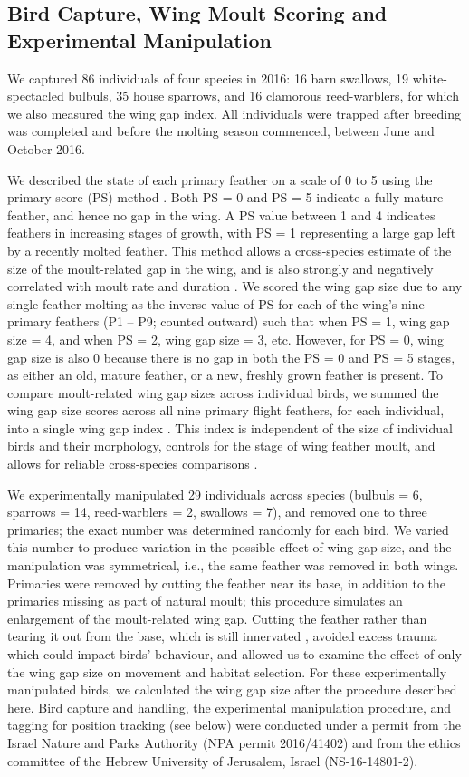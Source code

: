 \subsection*{Bird Capture, Wing Moult Scoring and Experimental Manipulation}

We captured 86 individuals of four species in 2016: 16 barn swallows, 19 white-spectacled bulbuls, 35 house sparrows, and 16 clamorous reed-warblers, for which we also measured the wing gap index.
All individuals were trapped after breeding was completed and before the molting season commenced, between June and October 2016.

We described the state of each primary feather on a scale of 0 to 5 using the primary score (PS) method \citep{ginn1983}.
Both PS = 0 and PS = 5 indicate a fully mature feather, and hence no gap in the wing.
A PS value between 1 and 4 indicates feathers in increasing stages of growth, with PS = 1 representing a large gap left by a recently molted feather.
This method allows a cross-species estimate of the size of the moult-related gap in the wing, and is also strongly and negatively correlated with moult rate and duration \citep{rohwer2009}.
We scored the wing gap size due to any single feather molting as the inverse value of PS for each of the wing's nine primary feathers (P1 -- P9; counted outward) such that when PS = 1, wing gap size = 4, and when PS = 2, wing gap size = 3, etc.
However, for PS = 0, wing gap size is also 0 because there is no gap in both the PS = 0 and PS = 5 stages, as either an old, mature feather, or a new, freshly grown feather is present.
To compare moult-related wing gap sizes across individual birds, we summed the wing gap size scores across all nine primary flight feathers, for each individual, into a single wing gap index \citep{kiat2016}.
This index is independent of the size of individual birds and their morphology, controls for the stage of wing feather moult, and allows for reliable cross-species comparisons \citep{bensch1993,kiat2016}.

We experimentally manipulated 29 individuals across species {(bulbuls = 6, sparrows = 14, reed-warblers = 2, swallows = 7)}, and removed one to three primaries; the exact number was determined randomly for each bird.
We varied this number to produce variation in the possible effect of wing gap size, and the manipulation was symmetrical, i.e., the same feather was removed in both wings.
Primaries were removed by cutting the feather near its base, in addition to the primaries missing as part of natural moult; this procedure simulates an enlargement of the moult-related wing gap.
Cutting the feather rather than tearing it out from the base, which is still innervated \parencite{jenni2020}, avoided excess trauma which could impact birds' behaviour, and allowed us to examine the effect of only the wing gap size on movement and habitat selection.
For these experimentally manipulated birds, we calculated the wing gap size after the procedure described here.
Bird capture and handling, the experimental manipulation procedure, and tagging for position tracking (see below) were conducted under a permit from the Israel Nature and Parks Authority (NPA permit 2016/41402) and from the ethics committee of the Hebrew University of Jerusalem, Israel (NS-16-14801-2).

